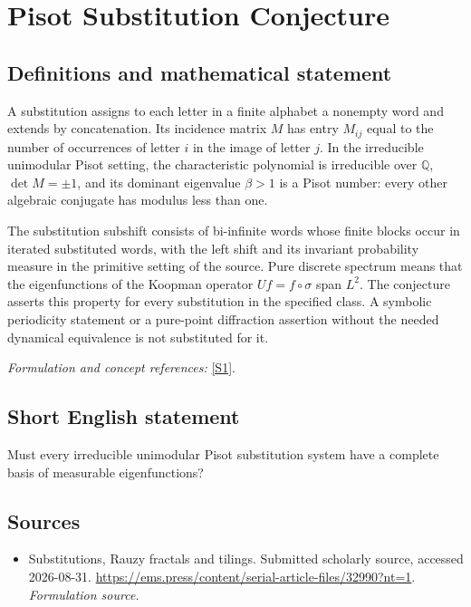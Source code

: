 \documentclass[11pt]{article}
\begin{document}
\section*{\texorpdfstring{Pisot Substitution Conjecture}{Pisot Substitution Conjecture}}\label{30006953}
\subsection{Definitions and mathematical statement}
A substitution assigns to each letter in a finite alphabet a nonempty word and extends by concatenation. Its incidence matrix $M$ has entry $M_{ij}$ equal to the number of occurrences of letter $i$ in the image of letter $j$. In the irreducible unimodular Pisot setting, the characteristic polynomial is irreducible over ${\mathbb{Q}}$, $\det M=\pm1$, and its dominant eigenvalue $\beta>1$ is a Pisot number: every other algebraic conjugate has modulus less than one.

The substitution subshift consists of bi-infinite words whose finite blocks occur in iterated substituted words, with the left shift and its invariant probability measure in the primitive setting of the source. Pure discrete spectrum means that the eigenfunctions of the Koopman operator $Uf=f\circ\sigma$ span $L^2$. The conjecture asserts this property for every substitution in the specified class. A symbolic periodicity statement or a pure-point diffraction assertion without the needed dynamical equivalence is not substituted for it.
\par\smallskip\textit{Formulation and concept references:} \href{https://ems.press/content/serial-article-files/32990?nt=1}{[S1]}.

\subsection{Short English statement}
Must every irreducible unimodular Pisot substitution system have a complete basis of measurable eigenfunctions?
\subsection{Sources}
\begin{itemize}
\item[S1]Substitutions, Rauzy fractals and tilings. Submitted scholarly source, accessed 2026-08-31.
\url{https://ems.press/content/serial-article-files/32990?nt=1}.
\textit{Formulation source.}
\end{itemize}
\end{document}
